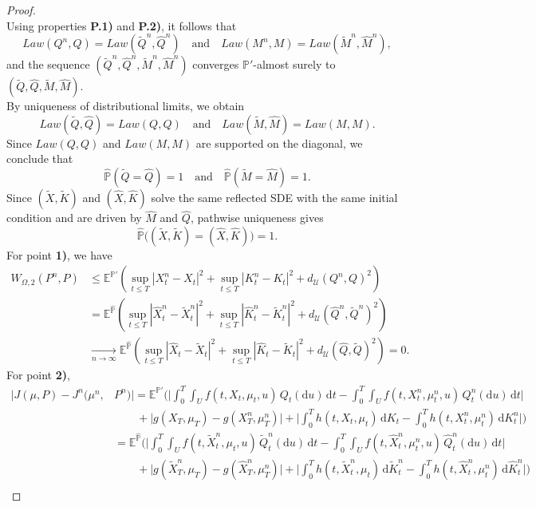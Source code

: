 \documentclass[11pt,amsfonts]{article}
\theoremstyle{plain}
\theoremstyle{assumpstyle}
\numberwithin{equation}{section}
\numberwithin{theorem}{section}
\numberwithin{proposition}{section}
\numberwithin{definition}{section}
\numberwithin{remark}{section}
\numberwithin{corollary}{section}
\numberwithin{lemma}{section}
\begin{document}
\begin{proof}
$$$$
Using properties \textbf{P.1)} and \textbf{P.2)}, it follows that
$$
Law(Q^n, Q) = Law(\tilde{Q}^n, \hat{Q}^n) \quad \text{and} \quad Law(M^n, M) = Law(\tilde{M}^n, \hat{M}^n),
$$
and the sequence $(\tilde{Q}^n, \hat{Q}^n, \tilde{M}^n, \hat{M}^n)$ converges $\mathbb{P}'$-almost surely to $(\tilde{Q}, \hat{Q}, \tilde{M}, \hat{M})$.\\
By uniqueness of distributional limits, we obtain
$$
Law(\tilde{Q}, \hat{Q}) = Law(Q, Q) \quad \text{and} \quad Law(\tilde{M}, \hat{M}) = Law(M, M).
$$
Since $Law(Q, Q)$ and $Law(M, M)$ are supported on the diagonal, we conclude that
$$
\hat{\mathbb{P}}(\tilde{Q} = \hat{Q}) = 1 \quad \text{and} \quad \hat{\mathbb{P}}(\tilde{M} = \hat{M}) = 1.
$$
Since $(\tilde{X},\tilde{K})$ and $(\hat{X},\hat{K})$ solve the same reflected SDE with the same initial condition and are driven by $\hat{M}$ and $\hat{Q}$, pathwise uniqueness gives
$$
\hat{\mathbb{P}}\big( (\tilde{X},\tilde{K})=(\hat{X},\hat{K}) \big)=1.
$$
For point \textbf{1)}, we have
\begin{align*}
W_{\Omega, 2}(P^n,P)
&\le \mathbb{E}^{\mathbb{P}'}\left(
\sup_{t\le T}|X^n_t-X_t|^2
+ \sup_{t\le T}|K^n_t-K_t|^2
+ d_{\mathcal{U}}(Q^n,Q)^2 \right) \\
&= \mathbb{E}^{\hat{\mathbb{P}}}\left(
\sup_{t\le T}|\hat{X}^n_t-\tilde{X}^n_t|^2
+ \sup_{t\le T}|\hat{K}^n_t-\tilde{K}^n_t|^2
+ d_{\mathcal{U}}(\hat{Q}^n,\tilde{Q}^n)^2 \right) \\
&\xrightarrow[n\to\infty]{} 
\mathbb{E}^{\hat{\mathbb{P}}}\!\left(
\sup_{t\le T}|\hat{X}_t-\tilde{X}_t|^2
+ \sup_{t\le T}|\hat{K}_t-\tilde{K}_t|^2
+ d_{\mathcal{U}}(\hat{Q},\tilde{Q})^2 \right)=0.
\end{align*}
For point \textbf{2)},
\begin{align*}
|J(\mu,P)-J^n(\mu^n,&P^n)|
=\mathbb{E}^{\mathbb{P}'}\Bigg(
\Big|\int_0^T\int_U f(t,X_t,\mu_t,u)\,Q_t(\mathrm{d}u)\,\mathrm{d}t
 -\int_0^T\int_U f(t,X^n_t,\mu^n_t,u)\,Q^n_t(\mathrm{d}u)\,\mathrm{d}t \Big| \\
&\qquad + \Big|g(X_T,\mu_T)-g(X^n_T,\mu^n_T)\Big|
 + \Big|\int_0^T h(t, X_t, \mu_t)\,\mathrm{d}K_t - \int_0^T h(t, X^n_t,\mu^n_t )\,\mathrm{d}K^n_t\Big| \Bigg) \\
&= \mathbb{E}^{\hat{\mathbb{P}}}\Bigg(
\Big|\int_0^T\int_U f(t,\tilde{X}^n_t,\mu_t,u)\,\tilde{Q}^n_t(\mathrm{d}u)\,\mathrm{d}t
 -\int_0^T\int_U f(t,\hat{X}^n_t,\mu^n_t,u)\,\hat{Q}^n_t(\mathrm{d}u)\,\mathrm{d}t \Big| \\
&\qquad + \Big|g(\tilde{X}^n_T,\mu_T)-g(\hat{X}^n_T,\mu^n_T)\Big|
 + \Big|\int_0^T h(t,\tilde{X}^n_t,\mu_t )\,\mathrm{d}\tilde{K}^n_t - \int_0^T h(t,\hat{X}^n_t,\mu^n_t)\,\mathrm{d}\hat{K}^n_t\Big| \Bigg) \\

\end{align*}
\end{proof}
\end{document}
